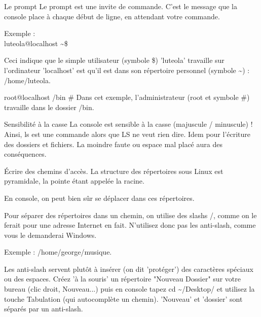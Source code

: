 \documentclass[10pt]{beamer}
\begin{document}
\begin{frame}{Le prompt}
	Le prompt est une invite de commande. C'est le message que la console place à
chaque début de ligne, en attendant votre commande.

Exemple : \\
\alert{luteola@localhost \textasciitilde \$}


Ceci indique que le simple utilisateur (symbole \$) 'luteola' travaille sur l'ordinateur
'localhost' est qu'il est dans son répertoire personnel (symbole \textasciitilde) : /home/luteola.


\alert{root@localhost /bin \#}
Dans cet exemple, l'administrateur (root et symbole \#) travaille dans le dossier
/bin.
\end{frame}


\begin{frame}{Sensibilité à la casse}
La console est sensible à la casse (majuscule / minuscule) ! Ainsi, ls est une
commande alors que LS ne veut rien dire. Idem pour l'écriture des dossiers et
fichiers. La moindre faute ou espace mal placé aura des conséquences.
\end{frame}


\begin{frame}{Écrire des chemins d'accès.}
	La structure des répertoires sous Linux est pyramidale, la pointe étant appelée la
racine. 

En console, on peut bien sûr se déplacer dans ces répertoires.


Pour séparer des répertoires dans un chemin, on utilise des slashs /, comme on le
ferait pour une adresse Internet en fait. N'utilisez donc pas les anti-slash, comme
vous le demanderai Windows. 

Exemple : /home/george/musique.\pause

Les anti-slash servent plutôt à insérer (on dit 'protéger') des caractères spéciaux ou
des espaces. Créez 'à la souris' un répertoire "Nouveau Dossier" sur votre bureau
(clic droit, Nouveau...) puis en console tapez cd \textasciitilde/Desktop/ et utilisez la touche
Tabulation (qui autocomplète un chemin). 'Nouveau' et 'dossier' sont séparés par
un anti-slash.
\end{frame}
\end{document}

